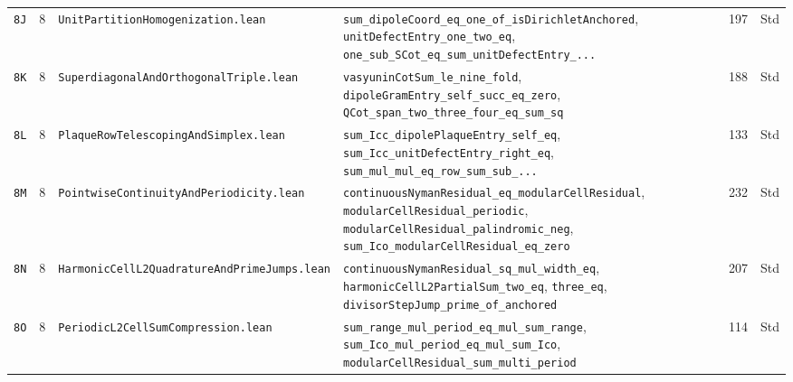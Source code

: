 \documentclass[11pt,a4paper]{article}
\theoremstyle{definition}
\begin{document}
\begin{longtable}{@{}ll>{\raggedright\arraybackslash}p{5.2cm}>{\raggedright\arraybackslash}p{6.8cm}cc@{}}
\texttt{8J} & 8 & \texttt{Unit\allowbreak Partition\allowbreak Homogenization.lean} & \texttt{sum\_\allowbreak dipoleCoord\_\allowbreak eq\_\allowbreak one\_\allowbreak of\_\allowbreak isDirichlet\allowbreak Anchored}, \texttt{unitDefectEntry\_\allowbreak one\_\allowbreak two\_\allowbreak eq}, \texttt{one\_\allowbreak sub\_\allowbreak SCot\_\allowbreak eq\_\allowbreak sum\_\allowbreak unitDefectEntry\_\allowbreak ...} & 197 & Std \\
\texttt{8K} & 8 & \texttt{Superdiagonal\allowbreak And\allowbreak Orthogonal\allowbreak Triple.lean} & \texttt{vasyuninCotSum\_\allowbreak le\_\allowbreak nine\_\allowbreak fold}, \texttt{dipoleGramEntry\_\allowbreak self\_\allowbreak succ\_\allowbreak eq\_\allowbreak zero}, \texttt{QCot\_\allowbreak span\_\allowbreak two\_\allowbreak three\_\allowbreak four\_\allowbreak eq\_\allowbreak sum\_\allowbreak sq} & 188 & Std \\
\texttt{8L} & 8 & \texttt{Plaque\allowbreak Row\allowbreak Telescoping\allowbreak And\allowbreak Simplex.lean} & \texttt{sum\_\allowbreak Icc\_\allowbreak dipolePlaqueEntry\_\allowbreak self\_\allowbreak eq}, \texttt{sum\_\allowbreak Icc\_\allowbreak unitDefectEntry\_\allowbreak right\_\allowbreak eq}, \texttt{sum\_\allowbreak mul\_\allowbreak mul\_\allowbreak eq\_\allowbreak row\_\allowbreak sum\_\allowbreak sub\_\allowbreak ...} & 133 & Std \\
\texttt{8M} & 8 & \texttt{Pointwise\allowbreak Continuity\allowbreak And\allowbreak Periodicity.lean} & \texttt{continuousNymanResidual\_\allowbreak eq\_\allowbreak modularCellResidual}, \texttt{modularCellResidual\_\allowbreak periodic}, \texttt{modularCellResidual\_\allowbreak palindromic\_\allowbreak neg}, \texttt{sum\_Ico\_\allowbreak modularCellResidual\_\allowbreak eq\_\allowbreak zero} & 232 & Std \\
\texttt{8N} & 8 & \texttt{Harmonic\allowbreak Cell\allowbreak L2\allowbreak Quadrature\allowbreak And\allowbreak Prime\allowbreak Jumps.lean} & \texttt{continuousNymanResidual\_\allowbreak sq\_\allowbreak mul\_\allowbreak width\_\allowbreak eq}, \texttt{harmonicCellL2PartialSum\_\allowbreak two\_\allowbreak eq}, \texttt{three\_\allowbreak eq}, \texttt{divisorStepJump\_\allowbreak prime\_\allowbreak of\_\allowbreak anchored} & 207 & Std \\
\texttt{8O} & 8 & \texttt{Periodic\allowbreak L2\allowbreak Cell\allowbreak Sum\allowbreak Compression.lean} & \texttt{sum\_range\_\allowbreak mul\_\allowbreak period\_\allowbreak eq\_\allowbreak mul\_\allowbreak sum\_\allowbreak range}, \texttt{sum\_Ico\_\allowbreak mul\_\allowbreak period\_\allowbreak eq\_\allowbreak mul\_\allowbreak sum\_\allowbreak Ico}, \texttt{modularCellResidual\_\allowbreak sum\_\allowbreak multi\_\allowbreak period} & 114 & Std \\

\end{longtable}
\end{document}
